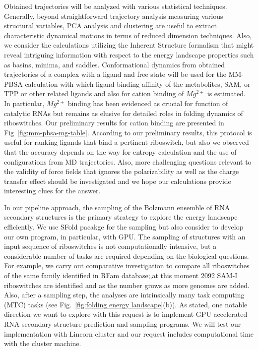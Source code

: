 \documentclass[a4paper,10pt]{article}
\begin{document}
Obtained trajectories will be analyzed with various statistical techniques.  Generally, beyond straightforward trajectory analysis measuring various structural variables, PCA analysis and clustering are useful to extract characteristic dynamical motions in terms of reduced dimension techniques\cite{kimjpcb2010, SAM-I-NAR2009}.   Also, we consider the calculations utilizing the Inherent Structure formalism that might reveal intriguing information with respect to the energy landscape properties such as basins, minima, and saddles\cite{kimpre2002,kimjcp2004}.  Conformational dynamics from obtained trajectories of a complex with a ligand and free state will be used for the MM-PBSA calculation with which ligand binding affinity of the metabolites, SAM, or TPP or other related ligands and also for cation binding of ${Mg^{2+}}$ is estimated.  In particular, ${Mg^{2+}}$ binding has been evidenced as crucial for function of catalytic RNAs but remains as elusive for detailed roles in folding dynamics of riboswitches.  Our preliminary results for cation binding are presented in Fig~\ref{fig:mm-pbsa-mg-table}.  According to our preliminary results, this protocol is useful for ranking ligands that bind a pertinent riboswitch, but also we observed that the accuracy depends on the way for entropy calculation and the use of configurations from MD trajectories.  Also, more challenging questions relevant to the validity of force fields that ignores the polarizability as well as the charge transfer effect should be investigated and we hope our calculations provide interesting clues for the answer.      

In our pipeline approach, the sampling of the Bolzmann ensemble of RNA secondary structures is the primary strategy to explore the energy landscape efficiently.  We use SFold pacakge\cite{ding2006} for the sampling but also consider to develop our own program, in particular, with GPU. The sampling of structures with an input sequence of riboswitches is not computationally intensive, but a considerable number of tasks are required depending on the biological questions.  For example, we carry out comparative investigation to compare all riboswitches of the same family identified in RFam database;,at this moment 2092 SAM-I riboswitches are identified and as the number grows as more genomes are added.  Also, after a sampling step, the analyses are intrinsically many task computing (MTC) tasks (see Fig.~\ref{fig:folding energy landscape}(b)).  
As stated, one notable direction we want to explore with this request is to implement GPU accelerated RNA secondary structure prediction and sampling programs.  We will test our implementation with Lincorn cluster and our request includes computational time with the cluster machine. 
\end{document}
